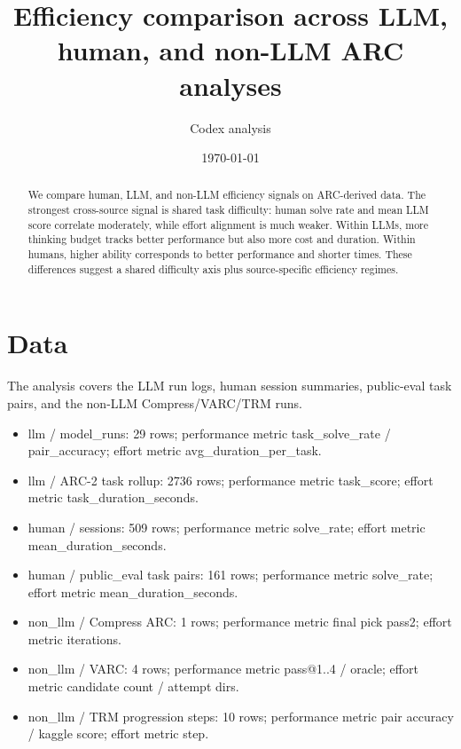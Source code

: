 \documentclass[11pt]{article}
\title{Efficiency comparison across LLM, human, and non-LLM ARC analyses}
\author{Codex analysis}
\date{\today}
\begin{document}
\maketitle
\begin{abstract}
We compare human, LLM, and non-LLM efficiency signals on ARC-derived data. The strongest cross-source signal is shared task difficulty: human solve rate and mean LLM score correlate moderately, while effort alignment is much weaker. Within LLMs, more thinking budget tracks better performance but also more cost and duration. Within humans, higher ability corresponds to better performance and shorter times. These differences suggest a shared difficulty axis plus source-specific efficiency regimes.
\end{abstract}
\section{Data}
The analysis covers the LLM run logs, human session summaries, public-eval task pairs, and the non-LLM Compress/VARC/TRM runs.
\begin{itemize}
\item llm / model\_runs: 29 rows; performance metric task\_solve\_rate / pair\_accuracy; effort metric avg\_duration\_per\_task.
\item llm / ARC-2 task rollup: 2736 rows; performance metric task\_score; effort metric task\_duration\_seconds.
\item human / sessions: 509 rows; performance metric solve\_rate; effort metric mean\_duration\_seconds.
\item human / public\_eval task pairs: 161 rows; performance metric solve\_rate; effort metric mean\_duration\_seconds.
\item non\_llm / Compress ARC: 1 rows; performance metric final pick pass2; effort metric iterations.
\item non\_llm / VARC: 4 rows; performance metric pass@1..4 / oracle; effort metric candidate count / attempt dirs.
\item non\_llm / TRM progression steps: 10 rows; performance metric pair accuracy / kaggle score; effort metric step.
\end{itemize}
\end{document}

